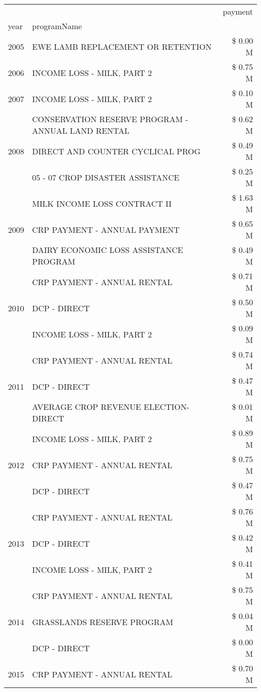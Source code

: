 \begin{tabular}{llr}
\toprule
 &  & payment \\
year & programName &  \\
\midrule
2005 & EWE LAMB REPLACEMENT OR RETENTION & \$ 0.00 M \\
\cline{1-3}
2006 & INCOME LOSS - MILK, PART 2 & \$ 0.75 M \\
\cline{1-3}
2007 & INCOME LOSS - MILK, PART 2 & \$ 0.10 M \\
\cline{1-3}
\multirow[t]{3}{*}{2008} & CONSERVATION RESERVE PROGRAM - ANNUAL LAND RENTAL & \$ 0.62 M \\
 & DIRECT AND COUNTER CYCLICAL PROG & \$ 0.49 M \\
 & 05 - 07 CROP DISASTER ASSISTANCE & \$ 0.25 M \\
\cline{1-3}
\multirow[t]{3}{*}{2009} & MILK INCOME LOSS CONTRACT II & \$ 1.63 M \\
 & CRP PAYMENT - ANNUAL PAYMENT & \$ 0.65 M \\
 & DAIRY ECONOMIC LOSS ASSISTANCE PROGRAM & \$ 0.49 M \\
\cline{1-3}
\multirow[t]{3}{*}{2010} & CRP PAYMENT - ANNUAL RENTAL & \$ 0.71 M \\
 & DCP - DIRECT & \$ 0.50 M \\
 & INCOME LOSS - MILK, PART 2 & \$ 0.09 M \\
\cline{1-3}
\multirow[t]{3}{*}{2011} & CRP PAYMENT - ANNUAL RENTAL & \$ 0.74 M \\
 & DCP - DIRECT & \$ 0.47 M \\
 & AVERAGE CROP REVENUE ELECTION-DIRECT & \$ 0.01 M \\
\cline{1-3}
\multirow[t]{3}{*}{2012} & INCOME LOSS - MILK, PART 2 & \$ 0.89 M \\
 & CRP PAYMENT - ANNUAL RENTAL & \$ 0.75 M \\
 & DCP - DIRECT & \$ 0.47 M \\
\cline{1-3}
\multirow[t]{3}{*}{2013} & CRP PAYMENT - ANNUAL RENTAL & \$ 0.76 M \\
 & DCP - DIRECT & \$ 0.42 M \\
 & INCOME LOSS - MILK, PART 2 & \$ 0.41 M \\
\cline{1-3}
\multirow[t]{3}{*}{2014} & CRP PAYMENT - ANNUAL RENTAL & \$ 0.75 M \\
 & GRASSLANDS RESERVE PROGRAM & \$ 0.04 M \\
 & DCP - DIRECT & \$ 0.00 M \\
\cline{1-3}
\multirow[t]{3}{*}{2015} & CRP PAYMENT - ANNUAL RENTAL & \$ 0.70 M \\

\end{tabular}
